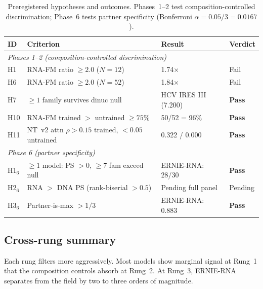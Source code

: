 \documentclass[11pt]{article}
\begin{document}
\begin{table}[ht]
\centering
\caption{Preregistered hypotheses and outcomes.
  Phases~1--2 test composition-controlled discrimination;
  Phase~6 tests partner specificity
  (Bonferroni $\alpha = 0.05/3 = 0.0167$).}
\label{tab:hypotheses}
\begin{tabular}{llll}
\toprule
ID & Criterion & Result & Verdict \\
\midrule
\multicolumn{4}{l}{\textit{Phases 1--2 (composition-controlled discrimination)}} \\
H1   & RNA-FM ratio $\geq 2.0$ ($N = 12$)                     & 1.74$\times$ & Fail \\
H6   & RNA-FM ratio $\geq 2.0$ ($N = 52$)                     & 1.84$\times$ & Fail \\
H7   & $\geq 1$ family survives dinuc null                     & HCV IRES III (7.200) & \textbf{Pass} \\
H10  & RNA-FM trained $>$ untrained $\geq 75\%$               & 50/52 = 96\% & \textbf{Pass} \\
H11  & NT~v2 attn $\rho > 0.15$ trained, $< 0.05$ untrained   & 0.322 / 0.000 & \textbf{Pass} \\
\midrule
\multicolumn{4}{l}{\textit{Phase 6 (partner specificity)}} \\
H1$_6$ & $\geq 1$ model: PS $> 0$, $\geq 7$ fam exceed null  & ERNIE-RNA: 28/30 & \textbf{Pass} \\
H2$_6$ & RNA $>$ DNA PS (rank-biserial $> 0.5$)               & Pending full panel & Pending \\
H3$_6$ & Partner-is-max $> 1/3$                                & ERNIE-RNA: 0.883 & \textbf{Pass} \\
\bottomrule
\end{tabular}
\end{table}


\subsection{Cross-rung summary}
\label{sec:crossrung}

Each rung filters more aggressively.  Most models show marginal
signal at Rung~1 that the composition controls absorb at Rung~2.  At
Rung~3, ERNIE-RNA separates from the field by two to three orders of
magnitude.
\end{document}
